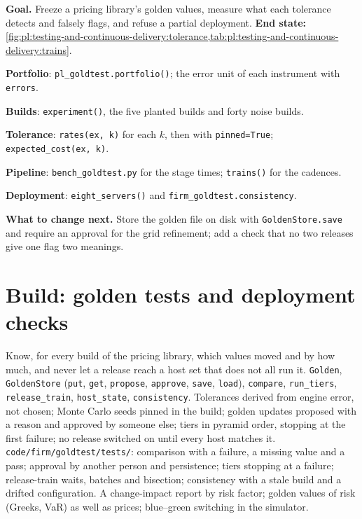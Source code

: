\begin{tutorial}
\textbf{Goal.} Freeze a pricing library's golden values, measure what each tolerance detects and falsely flags, and refuse a partial
deployment. \textbf{End state:} \cref{fig:pl:testing-and-continuous-delivery:tolerance,tab:pl:testing-and-continuous-delivery:trains}.
\begin{tutsteps}
\item \textbf{Portfolio}: \texttt{pl\_goldtest.portfolio()}; the error unit of each instrument with \texttt{errors}.
\item \textbf{Builds}: \texttt{experiment()}, the five planted builds and forty noise builds.
\item \textbf{Tolerance}: \texttt{rates(ex, k)} for each $k$, then with \texttt{pinned=True}; \texttt{expected\_cost(ex, k)}.
\item \textbf{Pipeline}: \texttt{bench\_goldtest.py} for the stage times; \texttt{trains()} for the cadences.
\item \textbf{Deployment}: \texttt{eight\_servers()} and \texttt{firm\_goldtest.consistency}.
\end{tutsteps}
\textbf{What to change next.} Store the golden file on disk with \texttt{GoldenStore.save} and require an approval for the grid refinement;
add a check that no two releases give one flag two meanings.
\end{tutorial}

\section{Build: golden tests and deployment checks}\label{bld:pl:testing-and-continuous-delivery:goldtest}

\begin{build}
 Know, for every build of the pricing library, which values moved and by how much, and never let a release reach a host set
that does not all run it.
 \texttt{Golden}, \texttt{GoldenStore} (\texttt{put}, \texttt{get}, \texttt{propose}, \texttt{approve}, \texttt{save},
\texttt{load}), \texttt{compare}, \texttt{run\_tiers}, \texttt{release\_train}, \texttt{host\_state}, \texttt{consistency}.
 Tolerances derived from engine error, not chosen; Monte Carlo seeds pinned in the build; golden updates proposed with a reason
and approved by someone else; tiers in pyramid order, stopping at the first failure; no release switched on until every host matches it.
 \texttt{code/firm/goldtest/tests/}: comparison with a failure, a missing value and a pass; approval by another
person and persistence; tiers stopping at a failure; release-train waits, batches and bisection; consistency with a stale build and a drifted
configuration.
 A change-impact report by risk factor; golden values of risk (Greeks, VaR) as well as prices; blue--green switching in the
simulator.
\end{build}

